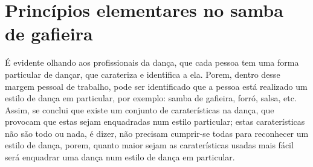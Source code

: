\section{Princípios elementares no samba de gafieira}
\label{sec:principiosambagafieira}

É evidente olhando aos profissionais da dança,
que cada pessoa tem uma forma particular de dançar, 
que carateriza e identifica a ela. Porem, 
dentro desse margem pessoal de trabalho, 
pode ser identificado que a pessoa está realizado um estilo de dança em particular,
por exemplo: samba de gafieira, forró, salsa, etc.
Assim, se conclui que existe um conjunto de caraterísticas na dança,
que provocam que estas sejam enquadradas num estilo particular;
estas caraterísticas não são todo ou nada, é dizer, 
não precisam cumprir-se todas para reconhecer um estilo de dança,
porem, quanto maior sejam as caraterísticas usadas mais fácil será enquadrar uma dança num estilo de dança em particular.

